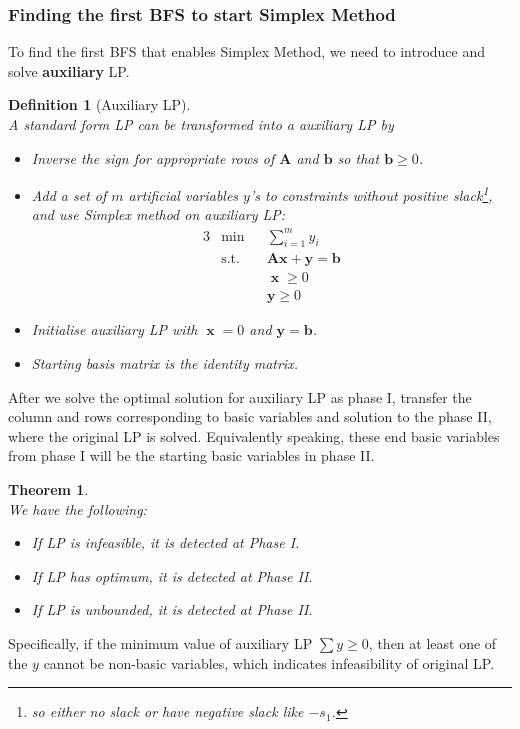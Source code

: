 \documentclass[12pt]{article}
\newcommand{\st}{\mathrm{s.t.}}
\newtheorem{definition}{Definition}[section]
\newtheorem{theorem}{Theorem}[section]
\theoremstyle{definition}
\DeclareMathOperator{\x}{\mathbf{x}}
\begin{document}
\subsubsection{Finding the first BFS to start Simplex Method}
To find the first BFS that enables Simplex Method, we need to introduce and solve \textbf{auxiliary} LP.
\begin{definition}[Auxiliary LP]
\hfill\\\normalfont A standard form LP can be transformed into a auxiliary LP by
\begin{itemize}
  \item Inverse the sign for appropriate rows of $\mathbf{A}$ and $\mathbf{b}$ so that $\mathbf{b}\geq 0$.
  \item Add a set of $m$ artificial variables $y$'s to constraints without positive slack\footnote{so either no slack or have negative slack like $-s_1$.}, and use Simplex method on auxiliary LP:
  \begin{alignat}{3}
  &\min&&\sum_{i=1}^m y_i\\
  &\st&&\mathbf{Ax}+\mathbf{y}=\mathbf{b}\\
  &&&\x\geq 0\\
  &&&\mathbf{y}\geq 0
  \end{alignat}
  \item Initialise auxiliary LP with $\x = 0$ and $\mathbf{y}=\mathbf{b}$.
  \item Starting basis matrix is the identity matrix.
\end{itemize}
\end{definition}
After we solve the optimal solution for auxiliary LP as phase I, transfer the column and rows corresponding to basic variables and solution to the phase II, where the original LP is solved. Equivalently speaking, these end basic variables from phase I will be the starting basic variables in phase II.
\begin{theorem}
\hfill\\\normalfont We have the following:
\begin{itemize}
  \item If LP is infeasible, it is detected at Phase I.
  \item If LP has optimum, it is detected at Phase II.
  \item If LP is unbounded, it is detected at Phase II.
\end{itemize}
\end{theorem}
Specifically, if the minimum value of auxiliary LP $\sum y\geq 0$, then at least one of the $y$ cannot be non-basic variables, which indicates infeasibility of original LP.\\
\end{document}
